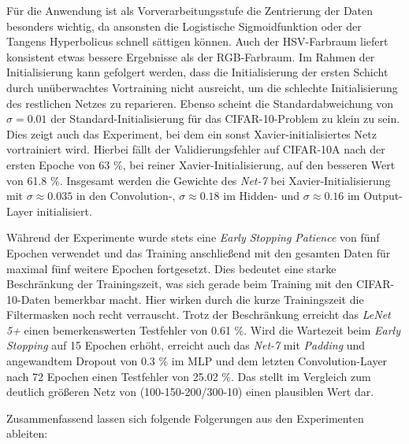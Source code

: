Für die Anwendung ist als Vorverarbeitungsstufe die Zentrierung der Daten besonders wichtig, da ansonsten die Logistische Sigmoidfunktion oder der Tangens Hyperbolicus schnell sättigen können. Auch der HSV-Farbraum liefert konsistent etwas bessere Ergebnisse als der RGB-Farbraum. Im Rahmen der Initialisierung kann gefolgert werden, dass die Initialisierung der ersten Schicht durch unüberwachtes Vortraining nicht ausreicht, um die schlechte Initialisierung des restlichen Netzes zu reparieren. Ebenso scheint die Standardabweichung von $\sigma = 0.01$ der Standard-Initialisierung für das CIFAR-10-Problem zu klein zu sein. Dies zeigt auch das Experiment, bei dem ein sonst Xavier-initialisiertes Netz vortrainiert wird. Hierbei fällt der Validierungsfehler auf CIFAR-10A nach der ersten Epoche von 63 \%, bei reiner Xavier-Initialisierung, auf den besseren Wert von 61.8 \%. Insgesamt werden die Gewichte des \textit{Net-7} bei Xavier-Initialisierung mit $\sigma \approx 0.035$ in den Convolution-, $\sigma \approx 0.18$  im Hidden- und $\sigma \approx 0.16$ im Output-Layer initialisiert. 

Während der Experimente wurde stets eine \textit{Early Stopping Patience} von fünf Epochen verwendet und das Training anschließend mit den gesamten Daten für maximal fünf weitere Epochen fortgesetzt. Dies bedeutet eine starke Beschränkung der Trainingszeit, was sich gerade beim Training mit den CIFAR-10-Daten bemerkbar macht. Hier wirken durch die kurze Trainingszeit die Filtermasken noch recht verrauscht. Trotz der Beschränkung erreicht das \textit{LeNet 5+} einen bemerkenswerten Testfehler von 0.61 \%. Wird die Wartezeit beim \textit{Early Stopping} auf 15 Epochen erhöht, erreicht auch das \textit{Net-7} mit \textit{Padding} und angewandtem Dropout von 0.3 \% im MLP und dem letzten Convolution-Layer nach 72 Epochen einen Testfehler von 25.02 \%. Das stellt im Vergleich zum deutlich größeren Netz von \cite{Masci2011} (100-150-200/300-10) einen plausiblen Wert dar.

Zusammenfassend lassen sich folgende Folgerungen aus den Experimenten ableiten:

